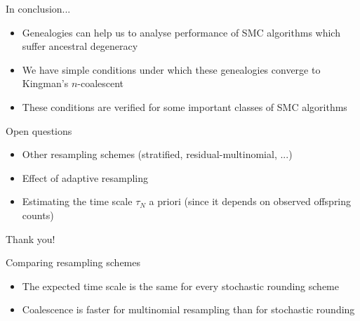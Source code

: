 \documentclass[aspectratio=169]{beamer}
\theoremstyle{definition}
\begin{document}
\begin{frame}{In conclusion...}
\begin{itemize}
\item Genealogies can help us to analyse performance of SMC algorithms which suffer ancestral degeneracy
\item We have simple conditions under which these genealogies converge to Kingman's $n$-coalescent
\item These conditions are verified for some important classes of SMC algorithms
\end{itemize}
\end{frame}


\begin{frame}{Open questions}
\begin{itemize}
\item Other resampling schemes (stratified, residual-multinomial, ...)
\item Effect of adaptive resampling
\item Estimating the time scale $\tau_N$ a priori (since it depends on observed offspring counts)
\end{itemize}
\end{frame}


\begin{frame}
\centering
\vspace{1cm}
{\Large Thank you!}
\end{frame}



\begin{frame}{Comparing resampling schemes}
\begin{itemize}
\item The expected time scale is the same for every stochastic rounding scheme
\item Coalescence is faster for multinomial resampling than for stochastic rounding
\end{itemize}
\end{frame}
\end{document}
